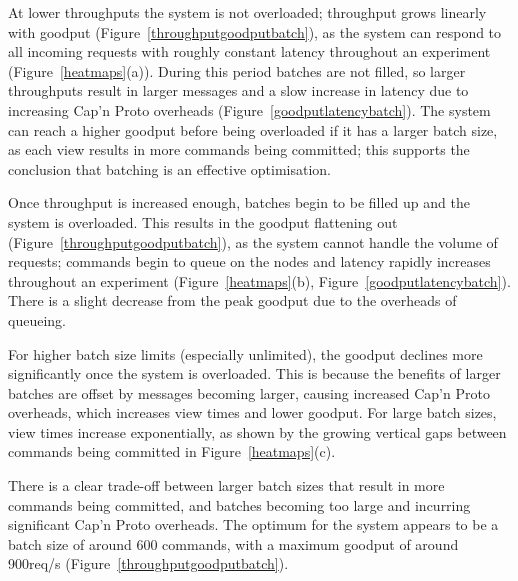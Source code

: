 At lower throughputs the system is not overloaded; throughput grows linearly with goodput (Figure~\ref{throughputgoodputbatch}), as the system can respond to all incoming requests with roughly constant latency throughout an experiment (Figure~\ref{heatmaps}(a)). During this period batches are not filled, so larger throughputs result in larger messages and a slow increase in latency due to increasing Cap'n Proto overheads (Figure~\ref{goodputlatencybatch}). The system can reach a higher goodput before being overloaded if it has a larger batch size, as each view results in more commands being committed; this supports the conclusion that batching is an effective optimisation.

Once throughput is increased enough, batches begin to be filled up and the system is overloaded. This results in the goodput flattening out (Figure~\ref{throughputgoodputbatch}), as the system cannot handle the volume of requests; commands begin to queue on the nodes and latency rapidly increases throughout an experiment (Figure~\ref{heatmaps}(b), Figure~\ref{goodputlatencybatch}). There is a slight decrease from the peak goodput due to the overheads of queueing.

For higher batch size limits (especially unlimited), the goodput declines more significantly once the system is overloaded. This is because the benefits of larger batches are offset by messages becoming larger, causing increased Cap'n Proto overheads, which increases view times and lower goodput. For large batch sizes, view times increase exponentially, as shown by the growing vertical gaps between commands being committed in Figure~\ref{heatmaps}(c).

There is a clear trade-off between larger batch sizes that result in more commands being committed, and batches becoming too large and incurring significant Cap'n Proto overheads. The optimum for the system appears to be a batch size of around 600 commands, with a maximum goodput of around 900req/s (Figure~\ref{throughputgoodputbatch}).


